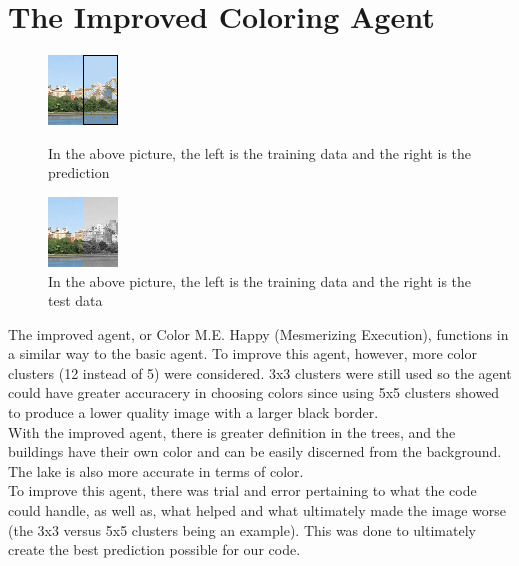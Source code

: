 \documentclass[12pt]{report}
\begin{document}
\section*{The Improved Coloring Agent}
\begin{figure}
\includegraphics[width=.5\textwidth]{Improved Agent Prediction}
\caption{In the above picture, the left is the training data and the right is the prediction}
\includegraphics[width=.5\textwidth]{Test Image}
\caption{In the above picture, the left is the training data and the right is the test data}
\end{figure}
The improved agent, or Color M.E. Happy (Mesmerizing Execution), functions in a similar way to the basic agent. To improve this agent, however, more color clusters (12 instead of 5) were considered. 3x3 clusters were still used so the agent could have greater accuracery in choosing colors since using 5x5 clusters showed to produce a lower quality image with a larger black border.\\
With the improved agent, there is greater definition in the trees, and the buildings have their own color and can be easily discerned from the background. The lake is also more accurate in terms of color.\\
To improve this agent, there was trial and error pertaining to what the code could handle, as well as, what helped and what ultimately made the image worse (the 3x3 versus 5x5 clusters being an example). This was done to ultimately create the best prediction possible for our code.\\
\end{document}
